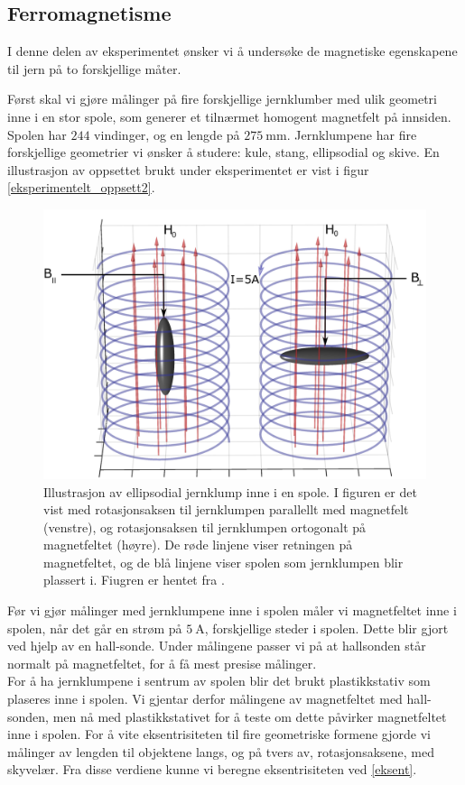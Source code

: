 \documentclass[%
 reprint,
 amsmath,amssymb,
 aps,
]{revtex4-1}
\begin{document}
\subsection{Ferromagnetisme}
I denne delen av eksperimentet ønsker vi å undersøke de magnetiske egenskapene til jern på to forskjellige måter.\par
Først skal vi gjøre målinger på fire forskjellige jernklumber med ulik geometri inne i en stor spole, som generer et tilnærmet homogent magnetfelt på innsiden. Spolen har $244$ vindinger, og en lengde på $\SI{275}{\milli\meter}$. Jernklumpene har fire forskjellige geometrier vi ønsker å studere: kule, stang, ellipsodial og skive. En illustrasjon av oppsettet brukt under eksperimentet er vist i figur \vref{eksperimentelt_oppsett2}.
\begin{figure}[h!]
  \centering
  \includegraphics[scale=0.3]{oppsett2.png}
  \caption{Illustrasjon av ellipsodial jernklump inne i en spole. I figuren er det vist med rotasjonsaksen til jernklumpen parallellt med magnetfelt (venstre), og rotasjonsaksen til jernklumpen ortogonalt på magnetfeltet (høyre). De røde linjene viser retningen på magnetfeltet, og de blå linjene viser spolen som jernklumpen blir plassert i. Fiugren er hentet fra \cite{oppgave}.}
  \label{eksperimentelt_oppsett2}
\end{figure}
Før vi gjør målinger med jernklumpene inne i spolen måler vi magnetfeltet inne i spolen, når det går en strøm på $\SI{5}{\ampere}$, forskjellige steder i spolen. Dette blir gjort ved hjelp av en hall-sonde. Under målingene passer vi på at hallsonden står normalt på magnetfeltet, for å få mest presise målinger.\\For å ha jernklumpene i sentrum av spolen blir det brukt plastikkstativ som plaseres inne i spolen. Vi gjentar derfor målingene av magnetfeltet med hall-sonden, men nå med plastikkstativet for å teste om dette påvirker magnetfeltet inne i spolen. For å vite eksentrisiteten til fire geometriske formene gjorde vi målinger av lengden til objektene langs, og på tvers av, rotasjonsaksene, med skyvelær. Fra disse verdiene kunne vi beregne eksentrisiteten ved \eqref{eksent}.\\
\end{document}
